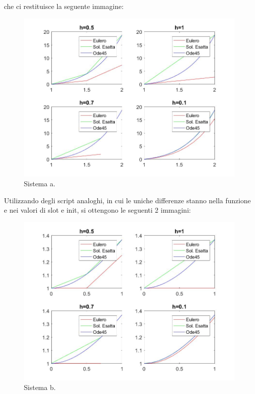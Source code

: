 \documentclass[11pt,a4paper,twoside,openright,titlepage,
headinclude,footinclude,BCOR5mm,
numbers=noenddot,cleardoublepage=empty,
tablecaptionabove]{scrbook}
\begin{document}
che ci restituisce la seguente immagine:
\begin{figure}[h!]
\centering
\includegraphics[width=\textwidth]{figs/ese2_4_a.jpg}
\caption{Sistema a.}
\end{figure}
\par
Utilizzando degli script analoghi, in cui le uniche differenze stanno nella funzione e nei
valori di slot e init, si ottengono le seguenti 2 immagini:
\begin{figure}[h!]
\centering
\includegraphics[width=\textwidth]{figs/ese2_4_b.jpg}
\caption{Sistema b.}
\end{figure}
\end{document}

